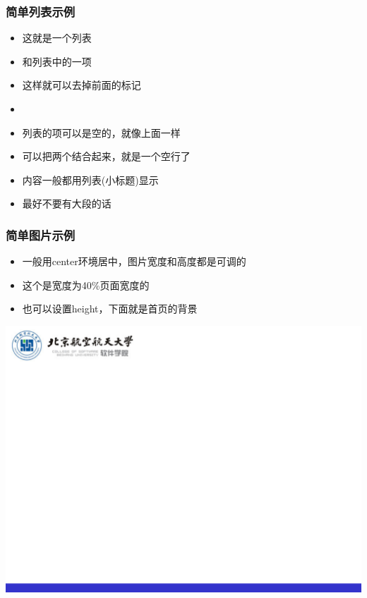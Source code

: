     \begin{frame}
        \frametitle{简单列表示例} 

        \begin{itemize}
            \item 这就是一个列表
            \item 和列表中的一项
            \item[] 这样就可以去掉前面的标记
            \item
            \item 列表的项可以是空的，就像上面一样
            \item 可以把两个结合起来，就是一个空行了
            \item 内容一般都用列表(小标题)显示
            \item 最好不要有大段的话
        \end{itemize}
    \end{frame}

    \begin{frame}
        \frametitle{简单图片示例}
        \begin{itemize}
            \item 一般用center环境居中，图片宽度和高度都是可调的
            \item 这个是宽度为40\%页面宽度的
            \item 也可以设置height，下面就是首页的背景
        \end{itemize}
        \begin{center}
            \includegraphics[width=.4\paperwidth]{pic/bg1.png}
        \end{center}
    \end{frame}

